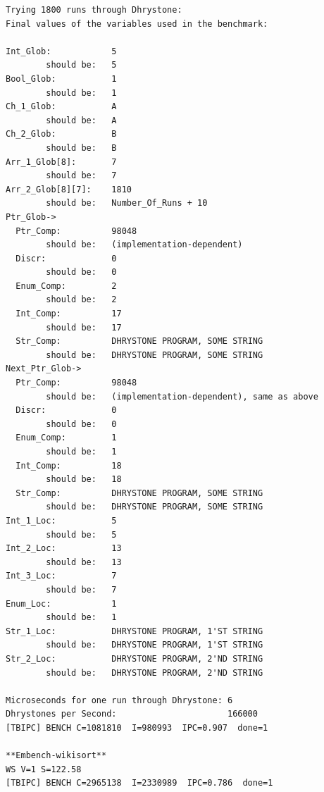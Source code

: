 ﻿\documentclass[UTF8,a4paper,12pt]{ctexart}
\begin{document}
\begin{Verbatim}[fontsize=\small,breaklines=true]
Trying 1800 runs through Dhrystone:
Final values of the variables used in the benchmark:

Int_Glob:            5
        should be:   5
Bool_Glob:           1
        should be:   1
Ch_1_Glob:           A
        should be:   A
Ch_2_Glob:           B
        should be:   B
Arr_1_Glob[8]:       7
        should be:   7
Arr_2_Glob[8][7]:    1810
        should be:   Number_Of_Runs + 10
Ptr_Glob->
  Ptr_Comp:          98048
        should be:   (implementation-dependent)
  Discr:             0
        should be:   0
  Enum_Comp:         2
        should be:   2
  Int_Comp:          17
        should be:   17
  Str_Comp:          DHRYSTONE PROGRAM, SOME STRING
        should be:   DHRYSTONE PROGRAM, SOME STRING
Next_Ptr_Glob->
  Ptr_Comp:          98048
        should be:   (implementation-dependent), same as above
  Discr:             0
        should be:   0
  Enum_Comp:         1
        should be:   1
  Int_Comp:          18
        should be:   18
  Str_Comp:          DHRYSTONE PROGRAM, SOME STRING
        should be:   DHRYSTONE PROGRAM, SOME STRING
Int_1_Loc:           5
        should be:   5
Int_2_Loc:           13
        should be:   13
Int_3_Loc:           7
        should be:   7
Enum_Loc:            1
        should be:   1
Str_1_Loc:           DHRYSTONE PROGRAM, 1'ST STRING
        should be:   DHRYSTONE PROGRAM, 1'ST STRING
Str_2_Loc:           DHRYSTONE PROGRAM, 2'ND STRING
        should be:   DHRYSTONE PROGRAM, 2'ND STRING

Microseconds for one run through Dhrystone: 6
Dhrystones per Second:                      166000
[TBIPC] BENCH C=1081810  I=980993  IPC=0.907  done=1

**Embench-wikisort**
WS V=1 S=122.58
[TBIPC] BENCH C=2965138  I=2330989  IPC=0.786  done=1
\end{Verbatim}
\end{document}
